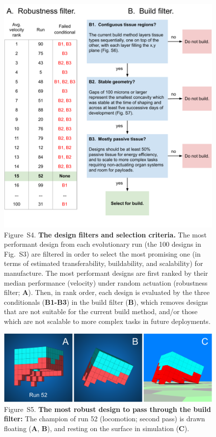 \begin{figure}[t]
\centering
\includegraphics[width=\linewidth]{Chapter07/img/Build flowchart.pdf}
\caption*{Figure~S4.  \textbf{The design filters and selection criteria.} 
The most performant design from each evolutionary run (the 100 designs in Fig.~S3) are filtered in order to select the most promising one (in terms of estimated transferability, buildability, and scalability) for manufacture. 
The most performant designs are first ranked by their median performance (velocity) under random actuation (robustness filter; \textbf{A}). 
Then, in rank order, each design is evaluated by the three conditionals (\textbf{B1-B3}) in the build filter (\textbf{B}), which removes designs that are not suitable for the current build method, and/or those which are not scalable to more complex tasks in future deployments.
}
\end{figure}

\begin{figure}
\centering
\includegraphics[width=\linewidth]{Chapter07/img/SupplementalMultiplyRealizable.png}
\caption*{Figure~S5.  \textbf{The most robust design to pass through the build filter:} The champion of run 52 (locomotion; second pass) is drawn floating (\textbf{A}, \textbf{B}), and resting on the surface in simulation (\textbf{C}).
\vspace{5em}
}
\end{figure}

